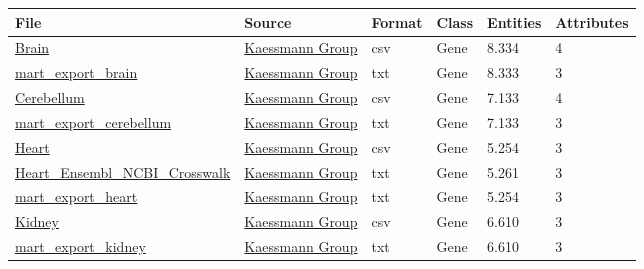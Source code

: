 \documentclass[11pt,titlepage,oneside,openany]{book}
\begin{document}
\begin{table}[!ht]
\centering
\setlength\extrarowheight{2pt} %
\begin{footnotesize}
\begin{tabularx}{\textwidth}{|l|l|l|l|l|l|}
\hline
\textbf{File} & \textbf{Source} & \textbf{Format} & \textbf{Class} & \textbf{Entities} & \textbf{Attributes} & \\ \hline

	\href{https://nahorgebre.s3.amazonaws.com/Brain.csv}{Brain} & \href{https://www.zmbh.uni-heidelberg.de/kaessmann/}{Kaessmann Group}  & csv & Gene & 8.334 & 4 \\
	
	\href{https://nahorgebre.s3.amazonaws.com/mart_export_brain.txt}{mart\_export\_brain} & \href{https://www.zmbh.uni-heidelberg.de/kaessmann/}{Kaessmann Group} & txt & Gene & 8.333 & 3 \\
	
	\href{https://nahorgebre.s3.amazonaws.com/Cerebellum.csv}{Cerebellum} & \href{https://www.zmbh.uni-heidelberg.de/kaessmann/}{Kaessmann Group}  & csv & Gene & 7.133 & 4 \\
	
	\href{https://nahorgebre.s3.amazonaws.com/mart_export_cerebellum.txt}{mart\_export\_cerebellum} & \href{https://www.zmbh.uni-heidelberg.de/kaessmann/}{Kaessmann Group} & txt & Gene & 7.133 & 3 \\
	
	\href{https://nahorgebre.s3.amazonaws.com/Heart.csv}{Heart} & \href{https://www.zmbh.uni-heidelberg.de/kaessmann/}{Kaessmann Group}  & csv & Gene & 5.254 & 3 \\
	
	\href{https://nahorgebre.s3.amazonaws.com/Heart_Ensembl_NCBI_Crosswalk.txt}{Heart\_Ensembl\_NCBI\_Crosswalk} & \href{https://www.zmbh.uni-heidelberg.de/kaessmann/}{Kaessmann Group} & txt & Gene & 5.261 & 3 \\
	
	\href{https://nahorgebre.s3.amazonaws.com/mart_export_heart.txt}{mart\_export\_heart} & \href{https://www.zmbh.uni-heidelberg.de/kaessmann/}{Kaessmann Group} & txt & Gene & 5.254 & 3 \\
	
	\href{https://nahorgebre.s3.amazonaws.com/Kidney.csv}{Kidney} & \href{https://www.zmbh.uni-heidelberg.de/kaessmann/}{Kaessmann Group}  & csv & Gene & 6.610 & 3 \\
	
	\href{https://nahorgebre.s3.amazonaws.com/mart_export_kidney.txt}{mart\_export\_kidney} & \href{https://www.zmbh.uni-heidelberg.de/kaessmann/}{Kaessmann Group} & txt & Gene & 6.610 & 3 \\
	

\end{tabularx}
\end{footnotesize}
\end{table}
\end{document}
